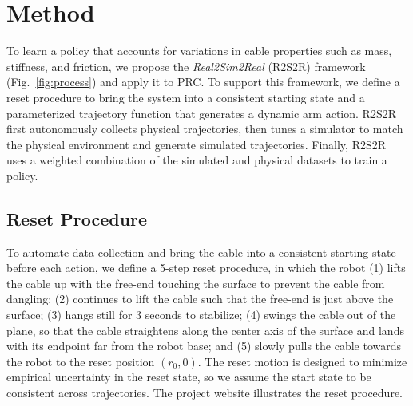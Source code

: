 \documentclass[letterpaper, 10pt, conference]{ieeeconf}  %
\newcommand{\remark}[3]{{\color{#2}[#1: #3]}}
\newcommand{\Lawrence}[1]{\remark{Lawrence}{orange}{#1}}
\newcommand{\jeffi}[1]{\remark{JI}{red}{#1}}
\begin{document}
\section{Method} \label{sec:approach}

To learn a policy that accounts for variations in cable properties such as mass, stiffness, and friction, %
we propose the \emph{Real2Sim2Real} (R2S2R) framework (Fig.~\ref{fig:process}) and apply it to PRC. To support this framework, we define a reset procedure to bring the system into a consistent starting state and a parameterized trajectory function that generates a dynamic arm action. R2S2R first autonomously collects physical trajectories, then tunes a simulator to match the physical environment and generate simulated trajectories. %
Finally, R2S2R uses a weighted combination of the simulated and physical datasets to train a policy.


\subsection{Reset Procedure}\label{ssec:resets}

To automate data collection and bring the cable into a consistent starting state before each action, we define a 5-step reset procedure, in which the robot
%
(1) lifts the cable up with the free-end touching the surface to prevent the cable from dangling;
(2) continues to lift the cable such that the free-end is just above the surface;
(3) hangs still for 3 seconds to stabilize; 
(4) swings the cable out of the plane, so that the cable straightens along the center axis of the surface and lands with its endpoint far from the robot base; and
(5) slowly pulls the cable towards the robot to the reset position $(r_0, 0)$. %
The reset motion is designed to minimize empirical uncertainty in the reset state, so we assume the start state to be consistent across trajectories. The project website illustrates the reset procedure.
\end{document}

